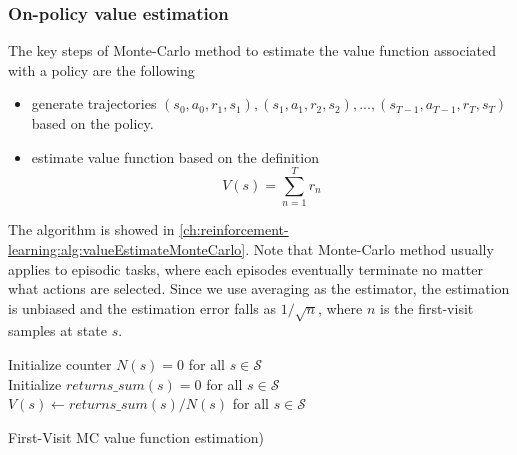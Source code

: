 \begin{refsection}
\subsubsection{On-policy value estimation}

The key steps of Monte-Carlo method to estimate the value function associated with a policy are the following
\begin{itemize}
	\item generate trajectories $(s_0, a_0, r_1, s_1), (s_1, a_1, r_2, s_2), ..., (s_{T-1}, a_{T-1}, r_{T}, s_T)$ based on the policy. 
	\item estimate value function based on the definition
	$$V(s) = \sum_{n=1}^{T} r_n$$
\end{itemize}

The algorithm is showed in \autoref{ch:reinforcement-learning:alg:valueEstimateMonteCarlo}. 
Note that Monte-Carlo method usually applies to episodic tasks, where each episodes eventually terminate no matter what actions are
selected. Since we use averaging as the estimator, the estimation is unbiased and the estimation error falls as $1/\sqrt{n}$, where $n$ is the first-visit samples at state $s$.



\begin{algorithm}[H]\label{ch:reinforcement-learning:alg:valueEstimateMonteCarlo}
	Initialize counter $N(s) = 0$ for all $s\in\mathcal{S}$ \\
	Initialize $returns\_sum(s) = 0$ for all $s\in\mathcal{S}$ \\
	$V(s) \leftarrow returns\_sum(s)/N(s)$ for all $s\in\mathcal{S}$\\
	\caption{First-Visit MC value function estimation)}
\end{algorithm}


\end{refsection}
